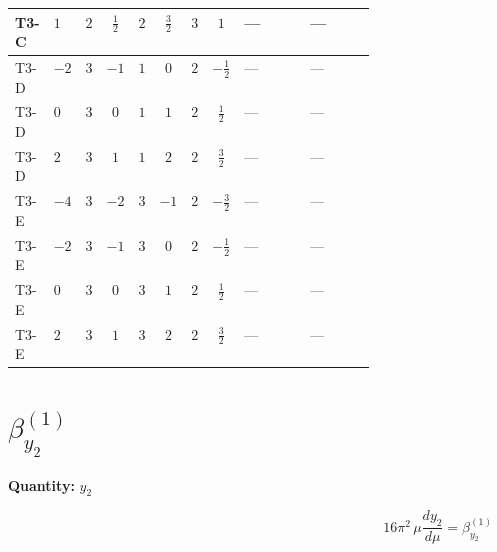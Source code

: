 \documentclass[8pt]{article}
\begin{document}
\begin{landscape}
\begin{longtable}{@{}llcccccc >{\raggedright\arraybackslash}p{0.21\linewidth} >{\raggedright\arraybackslash}p{0.21\linewidth}@{}}
\midrule
T3-C & $1$ & $2$ & $\frac{1}{2}$ & $2$ & $\frac{3}{2}$ & $3$ & $1$ & --- & --- \\
\midrule
T3-D & $-2$ & $3$ & $-1$ & $1$ & $0$ & $2$ & $-\frac{1}{2}$ & --- & --- \\
\midrule
T3-D & $0$ & $3$ & $0$ & $1$ & $1$ & $2$ & $\frac{1}{2}$ & --- & --- \\
\midrule
T3-D & $2$ & $3$ & $1$ & $1$ & $2$ & $2$ & $\frac{3}{2}$ & --- & --- \\
\midrule
T3-E & $-4$ & $3$ & $-2$ & $3$ & $-1$ & $2$ & $-\frac{3}{2}$ & --- & --- \\
\midrule
T3-E & $-2$ & $3$ & $-1$ & $3$ & $0$ & $2$ & $-\frac{1}{2}$ & --- & --- \\
\midrule
T3-E & $0$ & $3$ & $0$ & $3$ & $1$ & $2$ & $\frac{1}{2}$ & --- & --- \\
\midrule
T3-E & $2$ & $3$ & $1$ & $3$ & $2$ & $2$ & $\frac{3}{2}$ & --- & --- \\
\midrule
\bottomrule
\end{longtable}
\clearpage
\section*{$\beta_{y_2}^{(1)}$}
\noindent\textbf{Quantity: }$y_2$\par\smallskip
\[16\pi^2\,\mu\frac{d y_2}{d\mu}=\beta_{y_2}^{(1)}\]

\end{landscape}
\end{document}
